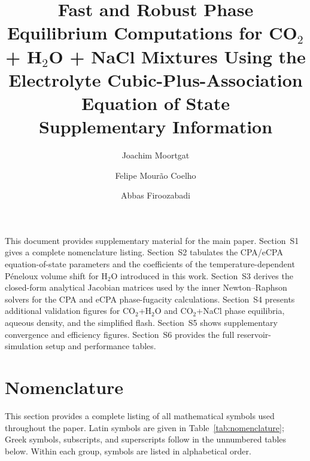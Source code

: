 \documentclass[preprint,12pt,number]{elsarticle}
\begin{document}
\begin{frontmatter}

\title{Fast and Robust Phase Equilibrium Computations for CO$_2$ + H$_2$O + NaCl Mixtures
       Using the Electrolyte Cubic-Plus-Association Equation of State\\[6pt]
       \large\normalfont Supplementary Information}

\author[ohio]{Joachim Moortgat}
\author[uga]{Felipe Mour\~{a}o Coelho}
\author[rice]{Abbas Firoozabadi}

\end{frontmatter}

\noindent
This document provides supplementary material for the main paper.
Section~S1 gives a complete nomenclature listing.
Section~S2 tabulates the CPA/eCPA equation-of-state parameters and the coefficients
of the temperature-dependent Péneloux volume shift for H$_2$O introduced in this work.
Section~S3 derives the closed-form analytical Jacobian matrices used by the inner
Newton--Raphson solvers for the CPA and eCPA phase-fugacity calculations.
Section~S4 presents additional validation figures for CO$_2$+H$_2$O and CO$_2$+NaCl
phase equilibria, aqueous density, and the simplified flash.
Section~S5 shows supplementary convergence and efficiency figures.
Section~S6 provides the full reservoir-simulation setup and performance tables.

\section{Nomenclature}
\label{sec:nomenclature}

\noindent This section provides a complete listing of all mathematical symbols used throughout the paper.
Latin symbols are given in Table~\ref{tab:nomenclature}; Greek symbols, subscripts, and
superscripts follow in the unnumbered tables below.
Within each group, symbols are listed in alphabetical order.
\end{document}
